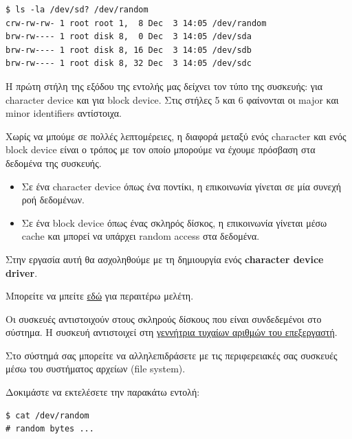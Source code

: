 \documentclass[18pt]{extarticle}
\begin{document}
\begin{commandline}
\begin{verbatim}
$ ls -la /dev/sd? /dev/random
crw-rw-rw- 1 root root 1,  8 Dec  3 14:05 /dev/random
brw-rw---- 1 root disk 8,  0 Dec  3 14:05 /dev/sda
brw-rw---- 1 root disk 8, 16 Dec  3 14:05 /dev/sdb
brw-rw---- 1 root disk 8, 32 Dec  3 14:05 /dev/sdc
\end{verbatim}
\end{commandline}

Η πρώτη στήλη της εξόδου της εντολής μας δείχνει τον τύπο της συσκευής:  για character device και  για block device.
Στις στήλες 5 και 6 φαίνονται οι major και minor identifiers αντίστοιχα.

\begin{info}[Σημείωση]
    Χωρίς να μπούμε σε πολλές λεπτομέρειες, η διαφορά μεταξύ ενός character και ενός block device 
    είναι ο τρόπος με τον οποίο μπορούμε να έχουμε πρόσβαση στα δεδομένα της συσκευής.

    \begin{itemize}
        \item Σε ένα character device όπως ένα ποντίκι, η επικοινωνία γίνεται σε μία συνεχή ροή δεδομένων.
        \item Σε ένα block device όπως ένας σκληρός δίσκος, η επικοινωνία γίνεται μέσω cache και μπορεί να υπάρχει random access στα δεδομένα. 
    \end{itemize}

    Στην εργασία αυτή θα ασχοληθούμε με τη δημιουργία ενός \textbf{character device driver}.

    Μπορείτε να μπείτε \href{https://tldp.org/LDP/khg/HyperNews/get/devices/basics.html}{εδώ} για περαιτέρω μελέτη.
\end{info}

Οι συσκευές  αντιστοιχούν στους σκληρούς δίσκους που είναι συνδεδεμένοι στο σύστημα.
Η συσκευή  αντιστοιχεί στη \href{https://en.wikipedia.org/wiki/Hardware_random_number_generator}{γεννήτρια τυχαίων αριθμών του επεξεργαστή}.



Στο σύστημά σας μπορείτε να αλληλεπιδράσετε με τις περιφερειακές σας συσκευές μέσω του συστήματος αρχείων (file system).

Δοκιμάστε να εκτελέσετε την παρακάτω εντολή:

\begin{commandline}
\begin{verbatim}
$ cat /dev/random    
# random bytes ...
\end{verbatim}
\end{commandline}
\end{document}
